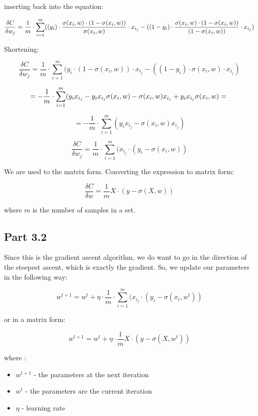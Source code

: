 \documentclass[a4paper]{iacas}
\begin{document}
inserting back into the equation:

$$\frac{\delta C}{\delta w_j} = \frac{1}{m}  \cdot \sum_{i=1}^{m}  ((y_{i}) \cdot \frac{\sigma(x_{i},w) \cdot (1-  \sigma(x_{i},w))}{\sigma(x_{i},w)}   \cdot x_{i_{j}} - \\ 
((1-y_{i}) \cdot \frac{\sigma(x_{i},w) \cdot (1-  \sigma(x_{i},w))}{(1-\sigma(x_{i},w))} \cdot x_{i_{j}})$$

Shortening:

$$\frac{\delta C}{\delta w_j} = \frac{1}{m}  \cdot \sum_{i=1}^{m}  (y_{i} \cdot (1-  \sigma(x_{i},w))   \cdot x_{i_{j}} - 
((1-y_{i}) \cdot \sigma(x_{i},w) \cdot x_{i_{j}})$$
 
$$= -\frac{1}{m}  \cdot \sum_{i=1}^{m}  (y_{i} x_{i_{j}} - y_{i}x_{i_{j}} \sigma(x_{i},w) - \sigma(x_{i},w) x_{i_{j}} +  y_{i}x_{i_{j}} \sigma(x_{i},w) = \\$$

$$= -\frac{1}{m}  \cdot \sum_{i=1}^{m}  (y_{i} x_{i_{j}}  - \sigma(x_{i},w) x_{i_{j}} )$$ 

$$\frac{\delta C}{\delta w_j} = \frac{1}{m}  \cdot \sum_{i=1}^{m}  (x_{i_{j}} \cdot ( y_{i}  - \sigma(x_{i},w) )$$


We are used to the matrix form. Converting the expression to matrix form:

$$\frac{\delta C}{\delta w} = \frac {1}{m} X \cdot ( y - \sigma(X, w))$$

where $m$ is the number of samples in a set. 

\subsection{Part 3.2}

Since this is the gradient ascent algorithm, we do want to go in the direction of the steepest ascent, which is exactly the gradient. So, we update our parameters in the following way:

$$w^{t+1} = w^{t} + \eta \cdot \frac{1}{m}  \cdot \sum_{i=1}^{m}  (x_{i_{j}} \cdot ( y_{i}  - \sigma(x_{i},w^{t}) )$$

or in a matrix form:

$$w^{t+1} = w^{t} + \eta \cdot \frac {1}{m} X \cdot ( y - \sigma(X, w^{t}))$$

where :

\begin{itemize}
  \item $w^{t+1}$ - the parameters at the next iteration
  \item $w^{t}$ - the parameters are the current iteration
  \item $\eta$ - learning rate
\end{itemize}
\end{document}
